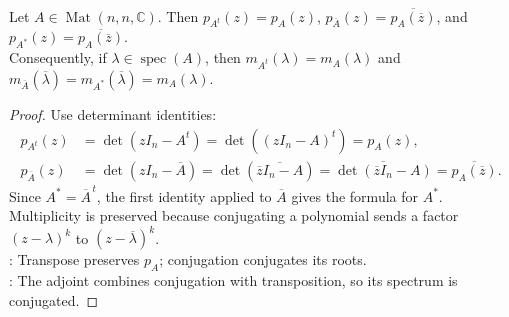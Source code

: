 \begin{proposition} \label{prop:transpose-conjugate-adjoint-characteristic-polynomial} \\
Let $A\in\operatorname{Mat}(n,n,\mathbb{C})$. Then $p_{A^t}(z)=p_A(z)$, $p_{\overline{A}}(z)=\overline{p_A(\overline{z})}$, and $p_{A^*}(z)=\overline{p_A(\overline{z})}$.\\
Consequently, if $\lambda\in\operatorname{spec}(A)$, then $m_{A^t}(\lambda)=m_A(\lambda)$ and $m_{\overline{A}}(\overline{\lambda})=m_{A^*}(\overline{\lambda})=m_A(\lambda)$.
\begin{proof}
Use determinant identities:
\begin{align}
p_{A^t}(z)&=\det(zI_n-A^t)=\det((zI_n-A)^t)=p_A(z), \nonumber\\
p_{\overline{A}}(z)&=\det(zI_n-\overline{A}) =\det(\overline{\overline{z}I_n-A}) =\overline{\det(\overline{z}I_n-A)} =\overline{p_A(\overline{z})}.
\nonumber
\end{align}
Since $A^*=\overline{A}^{\,t}$, the first identity applied to $\overline{A}$ gives the formula for $A^*$.\\
Multiplicity is preserved because conjugating a polynomial sends a factor $(z-\lambda)^k$ to $(z-\overline{\lambda})^k$.\\
: Transpose preserves $p_A$; conjugation conjugates its roots.\\
: The adjoint combines conjugation with transposition, so its spectrum is conjugated.
\end{proof}
\end{proposition}


